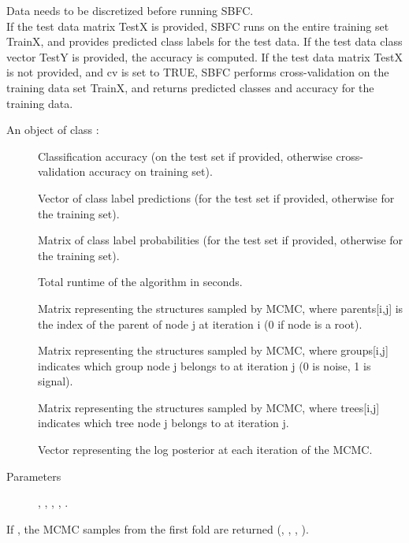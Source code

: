 \documentclass[a4paper]{book}
\begin{document}
%
\begin{Details}\relax
Data needs to be discretized before running SBFC. \\{}
If the test data matrix TestX is provided, SBFC runs on the entire training set TrainX, and provides predicted class labels for the test data. 
If the test data class vector TestY is provided, the accuracy is computed. 
If the test data matrix TestX is not provided, and cv is set to TRUE, SBFC performs cross-validation on the training data set TrainX, 
and returns predicted classes and accuracy for the training data. \\{}
\end{Details}
%
\begin{Value}
An object of class :
\begin{description}
     
\item[] Classification accuracy (on the test set if provided, otherwise cross-validation accuracy on training set).
\item[] Vector of class label predictions (for the test set if provided, otherwise for the training set).
\item[] Matrix of class label probabilities (for the test set if provided, otherwise for the training set).
\item[] Total runtime of the algorithm in seconds.
\item[] Matrix representing the structures sampled by MCMC, where parents[i,j] is the index of the parent of node j at iteration i (0 if node is a root).
\item[] Matrix representing the structures sampled by MCMC, where groups[i,j] indicates which group node j belongs to at iteration j (0 is noise, 1 is signal).
\item[] Matrix representing the structures sampled by MCMC, where trees[i,j] indicates which tree node j belongs to at iteration j.
\item[] Vector representing the log posterior at each iteration of the MCMC.
\item[Parameters] , , , , .

\end{description}

If , the MCMC samples from the first fold are returned (, , , ).
\end{Value}
\end{document}
